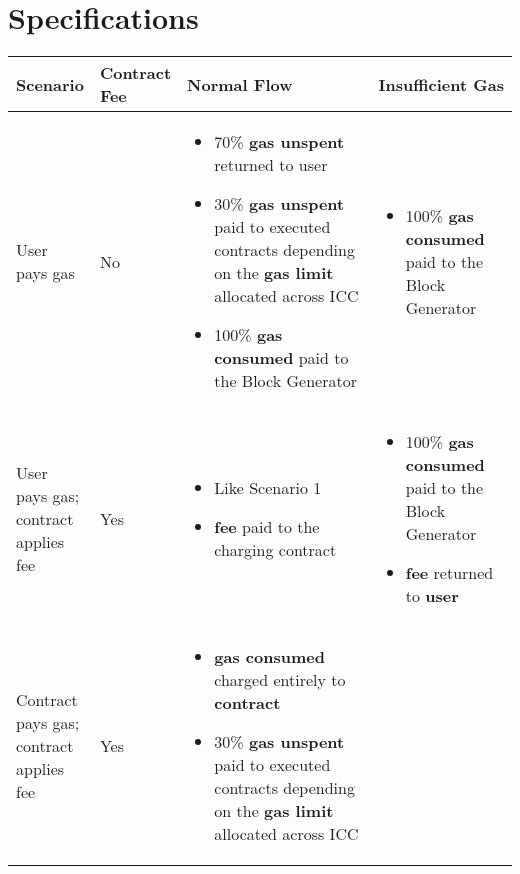 \documentclass[twocolumn, nofootinbib]{revtex4-2}
\begin{document}
    \section{Specifications}\label{sec:specifications}
    \begin{table*}[t]
    \begin{tabular}{|m{0.15\linewidth}|m{0.1\linewidth}|m{0.45\linewidth}|m{0.3\linewidth}|}
        \hline
        \textbf{Scenario} & \textbf{Contract Fee} &
        \textbf{Normal Flow} & \textbf{Insufficient Gas} \\
        \hline
        \hline
        User pays gas & No &
        \begin{itemize}
            \item 70\% \textbf{gas unspent} returned to user
            \item 30\% \textbf{gas unspent} paid to executed contracts depending
                  on the \textbf{gas limit} allocated across ICC
            \item 100\% \textbf{gas consumed} paid to the Block Generator
        \end{itemize} &
        \begin{itemize}
            \item 100\% \textbf{gas consumed} paid to the Block Generator
        \end{itemize} \\
        \hline
        User pays gas; contract applies fee & Yes &
        \begin{itemize}
            \item Like Scenario 1
            \item \textbf{fee} paid to the charging contract
        \end{itemize} &
        \begin{itemize}
            \item 100\% \textbf{gas consumed} paid to the Block Generator
            \item \textbf{fee} returned to \textbf{user}
        \end{itemize} \\
        \hline
        Contract pays gas; contract applies fee & Yes &
        \begin{itemize}
            \item \textbf{gas consumed} charged entirely to \textbf{contract}
            \item 30\% \textbf{gas unspent} paid to executed contracts depending
                  on the \textbf{gas limit} allocated across ICC

\end{itemize}
\end{tabular}
\end{table*}
\end{document}
